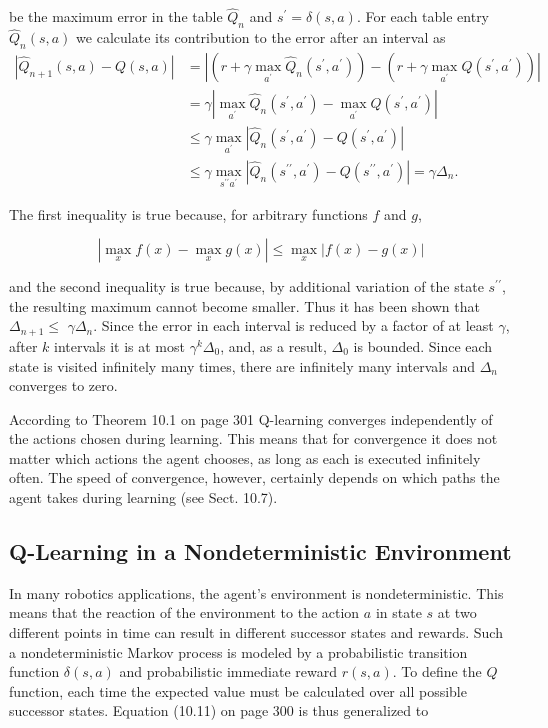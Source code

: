\documentclass[10pt]{book}
\begin{document}
be the maximum error in the table $\hat{Q}_{n}$ and $s^{\prime}=\delta(s, a)$. For each table entry $\hat{Q}_{n}(s, a)$ we calculate its contribution to the error after an interval as
$$
\begin{aligned}
\left|\hat{Q}_{n+1}(s, a)-Q(s, a)\right| & =\left|\left(r+\gamma \max _{a^{\prime}} \hat{Q}_{n}\left(s^{\prime}, a^{\prime}\right)\right)-\left(r+\gamma \max _{a^{\prime}} Q\left(s^{\prime}, a^{\prime}\right)\right)\right| \\
& =\gamma\left|\max _{a^{\prime}} \hat{Q}_{n}\left(s^{\prime}, a^{\prime}\right)-\max _{a^{\prime}} Q\left(s^{\prime}, a^{\prime}\right)\right| \\
& \leq \gamma \max _{a^{\prime}}\left|\hat{Q}_{n}\left(s^{\prime}, a^{\prime}\right)-Q\left(s^{\prime}, a^{\prime}\right)\right| \\
& \leq \gamma \max _{s^{\prime \prime} a^{\prime}}\left|\hat{Q}_{n}\left(s^{\prime \prime}, a^{\prime}\right)-Q\left(s^{\prime \prime}, a^{\prime}\right)\right|=\gamma \Delta_{n} .
\end{aligned}
$$

The first inequality is true because, for arbitrary functions $f$ and $g$,

$$
\left|\max _{x} f(x)-\max _{x} g(x)\right| \leq \max _{x}|f(x)-g(x)|
$$

and the second inequality is true because, by additional variation of the state $s^{\prime \prime}$, the resulting maximum cannot become smaller. Thus it has been shown that $\Delta_{n+1} \leq$ $\gamma \Delta_{n}$. Since the error in each interval is reduced by a factor of at least $\gamma$, after $k$ intervals it is at most $\gamma^{k} \Delta_{0}$, and, as a result, $\Delta_{0}$ is bounded. Since each state is visited infinitely many times, there are infinitely many intervals and $\Delta_{n}$ converges to zero.

According to Theorem 10.1 on page 301 Q-learning converges independently of the actions chosen during learning. This means that for convergence it does not matter which actions the agent chooses, as long as each is executed infinitely often. The speed of convergence, however, certainly depends on which paths the agent takes during learning (see Sect. 10.7).

\subsection{Q-Learning in a Nondeterministic Environment}
In many robotics applications, the agent's environment is nondeterministic. This means that the reaction of the environment to the action $a$ in state $s$ at two different points in time can result in different successor states and rewards. Such a nondeterministic Markov process is modeled by a probabilistic transition function $\delta(s, a)$ and probabilistic immediate reward $r(s, a)$. To define the $Q$ function, each time the expected value must be calculated over all possible successor states. Equation (10.11) on page 300 is thus generalized to
\end{document}
